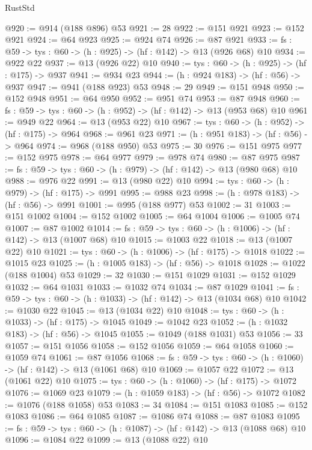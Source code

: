 \begin{lexlean}{RustStd}
\begin{coremodule}
@920 := @914 (@188 @896) @53
@921 := 28
@922 := @151 @921
@923 := @152 @921
@924 := @64 @923
@925 := @924 @74
@926 := @87 @921
@933 := {fs : @59} -> {tys : @60} -> (h : @925) -> (hf : @142) -> @13 (@926 @68) @10
@934 := @922 @22
@937 := @13 (@926 @22) @10
@940 := {tys : @60} -> (h : @925) -> (hf : @175) -> @937
@941 := @934 @23
@944 := (h : @924 @183) -> (hf : @56) -> @937
@947 := @941 (@188 @923) @53
@948 := 29
@949 := @151 @948
@950 := @152 @948
@951 := @64 @950
@952 := @951 @74
@953 := @87 @948
@960 := {fs : @59} -> {tys : @60} -> (h : @952) -> (hf : @142) -> @13 (@953 @68) @10
@961 := @949 @22
@964 := @13 (@953 @22) @10
@967 := {tys : @60} -> (h : @952) -> (hf : @175) -> @964
@968 := @961 @23
@971 := (h : @951 @183) -> (hf : @56) -> @964
@974 := @968 (@188 @950) @53
@975 := 30
@976 := @151 @975
@977 := @152 @975
@978 := @64 @977
@979 := @978 @74
@980 := @87 @975
@987 := {fs : @59} -> {tys : @60} -> (h : @979) -> (hf : @142) -> @13 (@980 @68) @10
@988 := @976 @22
@991 := @13 (@980 @22) @10
@994 := {tys : @60} -> (h : @979) -> (hf : @175) -> @991
@995 := @988 @23
@998 := (h : @978 @183) -> (hf : @56) -> @991
@1001 := @995 (@188 @977) @53
@1002 := 31
@1003 := @151 @1002
@1004 := @152 @1002
@1005 := @64 @1004
@1006 := @1005 @74
@1007 := @87 @1002
@1014 := {fs : @59} -> {tys : @60} -> (h : @1006) -> (hf : @142) -> @13 (@1007 @68) @10
@1015 := @1003 @22
@1018 := @13 (@1007 @22) @10
@1021 := {tys : @60} -> (h : @1006) -> (hf : @175) -> @1018
@1022 := @1015 @23
@1025 := (h : @1005 @183) -> (hf : @56) -> @1018
@1028 := @1022 (@188 @1004) @53
@1029 := 32
@1030 := @151 @1029
@1031 := @152 @1029
@1032 := @64 @1031
@1033 := @1032 @74
@1034 := @87 @1029
@1041 := {fs : @59} -> {tys : @60} -> (h : @1033) -> (hf : @142) -> @13 (@1034 @68) @10
@1042 := @1030 @22
@1045 := @13 (@1034 @22) @10
@1048 := {tys : @60} -> (h : @1033) -> (hf : @175) -> @1045
@1049 := @1042 @23
@1052 := (h : @1032 @183) -> (hf : @56) -> @1045
@1055 := @1049 (@188 @1031) @53
@1056 := 33
@1057 := @151 @1056
@1058 := @152 @1056
@1059 := @64 @1058
@1060 := @1059 @74
@1061 := @87 @1056
@1068 := {fs : @59} -> {tys : @60} -> (h : @1060) -> (hf : @142) -> @13 (@1061 @68) @10
@1069 := @1057 @22
@1072 := @13 (@1061 @22) @10
@1075 := {tys : @60} -> (h : @1060) -> (hf : @175) -> @1072
@1076 := @1069 @23
@1079 := (h : @1059 @183) -> (hf : @56) -> @1072
@1082 := @1076 (@188 @1058) @53
@1083 := 34
@1084 := @151 @1083
@1085 := @152 @1083
@1086 := @64 @1085
@1087 := @1086 @74
@1088 := @87 @1083
@1095 := {fs : @59} -> {tys : @60} -> (h : @1087) -> (hf : @142) -> @13 (@1088 @68) @10
@1096 := @1084 @22
@1099 := @13 (@1088 @22) @10

\end{coremodule}
\end{lexlean}
